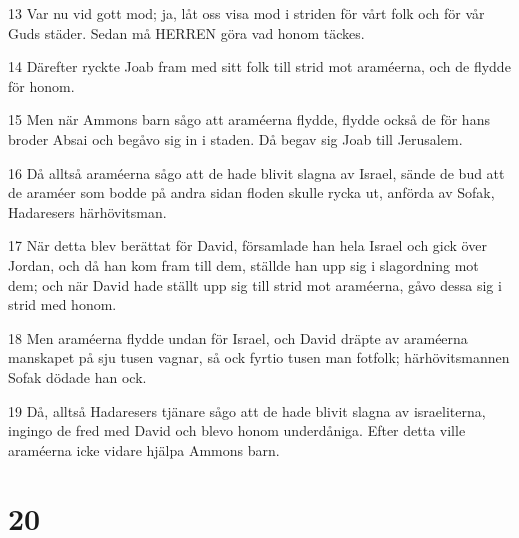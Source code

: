 \par 13 Var nu vid gott mod; ja, låt oss visa mod i striden för vårt folk och för vår Guds städer. Sedan må HERREN göra vad honom täckes.
\par 14 Därefter ryckte Joab fram med sitt folk till strid mot araméerna, och de flydde för honom.
\par 15 Men när Ammons barn sågo att araméerna flydde, flydde också de för hans broder Absai och begåvo sig in i staden. Då begav sig Joab till Jerusalem.
\par 16 Då alltså araméerna sågo att de hade blivit slagna av Israel, sände de bud att de araméer som bodde på andra sidan floden skulle rycka ut, anförda av Sofak, Hadaresers härhövitsman.
\par 17 När detta blev berättat för David, församlade han hela Israel och gick över Jordan, och då han kom fram till dem, ställde han upp sig i slagordning mot dem; och när David hade ställt upp sig till strid mot araméerna, gåvo dessa sig i strid med honom.
\par 18 Men araméerna flydde undan för Israel, och David dräpte av araméerna manskapet på sju tusen vagnar, så ock fyrtio tusen man fotfolk; härhövitsmannen Sofak dödade han ock.
\par 19 Då, alltså Hadaresers tjänare sågo att de hade blivit slagna av israeliterna, ingingo de fred med David och blevo honom underdåniga. Efter detta ville araméerna icke vidare hjälpa Ammons barn.

\chapter{20}

